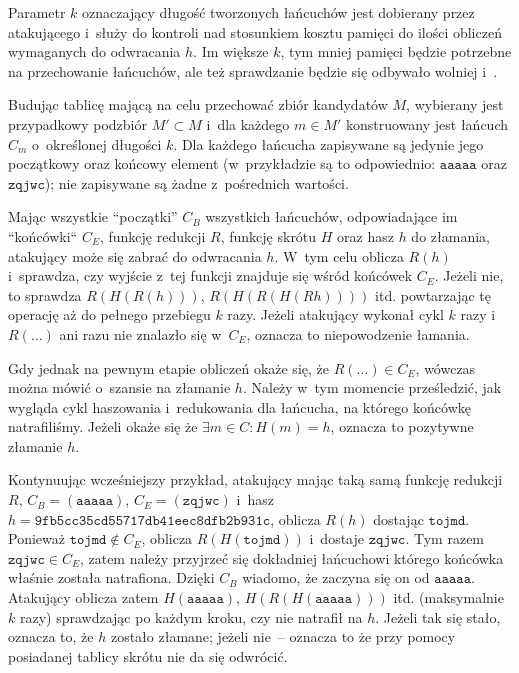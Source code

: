 Parametr $k$ oznaczający długość tworzonych łańcuchów jest dobierany przez
atakującego i~służy do kontroli nad stosunkiem kosztu pamięci do ilości
obliczeń wymaganych do odwracania $h$. Im większe $k$, tym mniej pamięci będzie
potrzebne na przechowanie łańcuchów, ale też sprawdzanie będzie się odbywało
wolniej i~.

Budując tablicę mającą na celu przechować zbiór kandydatów $M$, wybierany jest
przypadkowy podzbiór $M' \subset M$ i~dla każdego $m \in M'$ konstruowany jest
łańcuch $C_m$ o~określonej długości $k$. Dla każdego łańcucha zapisywane są
jedynie jego początkowy oraz końcowy element (w~przykładzie są to odpowiednio:
$\mathtt{aaaaa}$ oraz $\mathtt{zqjwc}$); nie zapisywane są żadne z~pośrednich
wartości.

Mając wszystkie ``początki'' $C_B$ wszystkich łańcuchów, odpowiadające im
``końcówki`` $C_E$, funkcję redukcji $R$, funkcję skrótu $H$ oraz hasz $h$ do
złamania, atakujący może się zabrać do odwracania $h$. W~tym celu oblicza
$R(h)$ i~sprawdza, czy wyjście z~tej funkcji znajduje się wśród końcówek $C_E$.
Jeżeli nie, to sprawdza $R(H(R(h)))$, $R(H(R(H(Rh))))$ itd. powtarzając tę
operację aż do pełnego przebiegu $k$ razy. Jeżeli atakujący wykonał cykl $k$
razy i~$R(\ldots)$ ani razu nie znalazło się w~$C_E$, oznacza to niepowodzenie
łamania.

Gdy jednak na pewnym etapie obliczeń okaże się, że $R(\ldots) \in C_E$, wówczas
można mówić o~szansie na złamanie $h$. Należy w~tym momencie prześledzić, jak
wygląda cykl haszowania i~redukowania dla łańcucha, na którego końcówkę
natrafiliśmy. Jeżeli okaże się że $\exists m \in C : H(m) = h$, oznacza to
pozytywne złamanie $h$.

Kontynuując wcześniejszy przykład, atakujący mając taką samą funkcję redukcji
$R$, $C_B = (\mathtt{aaaaa})$, $C_E = (\mathtt{zqjwc})$ i~hasz
$h=\mathtt{9fb5cc35cd55717db41eec8dfb2b931c}$, oblicza $R(h)$ dostając
$\mathtt{tojmd}$. Ponieważ $\mathtt{tojmd} \not\in C_E$, oblicza
$R(H(\mathtt{tojmd}))$ i~dostaje $\mathtt{zqjwc}$. Tym razem $\mathtt{zqjwc}
\in C_E$, zatem należy przyjrzeć się dokładniej łańcuchowi którego końcówka
właśnie została natrafiona. Dzięki $C_B$ wiadomo, że zaczyna się on od
$\mathtt{aaaaa}$. Atakujący oblicza zatem $H(\mathtt{aaaaa})$,
$H(R(H(\mathtt{aaaaa})))$ itd. (maksymalnie $k$ razy) sprawdzając po każdym
kroku, czy nie natrafił na $h$. Jeżeli tak się stało, oznacza to, że $h$
zostało złamane; jeżeli nie~-- oznacza to że przy pomocy posiadanej tablicy
skrótu nie da się odwrócić.


